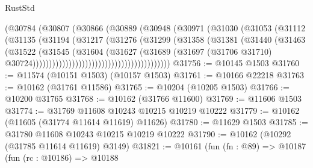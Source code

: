 \begin{lexlean}{RustStd}
\begin{coremodule}
                                        (@30784
                                          (@30807
                                            (@30866
                                              (@30889
                                                (@30948
                                                  (@30971
                                                    (@31030
                                                      (@31053
                                                        (@31112
                                                          (@31135
                                                            (@31194
                                                              (@31217
                                                                (@31276
                                                                  (@31299
                                                                    (@31358
                                                                      (@31381
                                                                        (@31440
                                                                          (@31463
                                                                            (@31522
                                                                              (@31545
                                                                                (@31604
                                                                                  (@31627
                                                                                    (@31689
                                                                                      (@31697
                                                                                        (@31706
                                                                                          @31710)
                                                                                        @30724))))))))))))))))))))))))))))))))))))))))))
@31756 := @10145 @1503
@31760 := @11574 (@10151 @1503) (@10157 @1503)
@31761 := @10166 @22218
@31763 := @10162 (@31761 @11586)
@31765 := @10204 (@10205 @1503)
@31766 := @10200 @31765
@31768 := @10162 (@31766 @11600)
@31769 := @11606 @1503
@31774 := @31769 @11608 @10243 @10215 @10219 @10222
@31779 := @10162 (@11605 (@31774 @11614 @11619) @11626)
@31780 := @11629 @1503
@31785 := @31780 @11608 @10243 @10215 @10219 @10222
@31790 := @10162 (@10292 (@31785 @11614 @11619) @3149)
@31821 := @10161
    (fun (fn : @89) =>
    @10187
      (fun (rc : @10186) =>
      @10188

\end{coremodule}
\end{lexlean}
